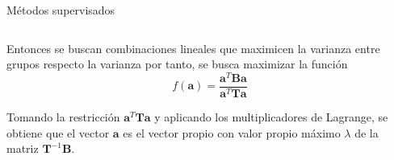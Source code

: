 \begin{frame}{Métodos supervisados}
\begin{columns}
\begin{column}{0.9\textwidth}

Entonces se buscan combinaciones lineales que maximicen la varianza entre grupos respecto la varianza por tanto, se busca maximizar la función
\begin{equation}
f(\mathbf{a})=\dfrac{\mathbf{a}^T\mathbf{Ba}}{\mathbf{a}^T\mathbf{Ta}}
\end{equation}

Tomando la restricción $\mathbf{a}^T\mathbf{T}\mathbf{a}$ y aplicando los multiplicadores de Lagrange, se obtiene que el vector $\mathbf{a}$ es el vector propio con valor propio máximo $\lambda$ de la matriz $\mathbf{T}^{-1}\mathbf{B}$.

\end{column}
\end{columns}
\end{frame}